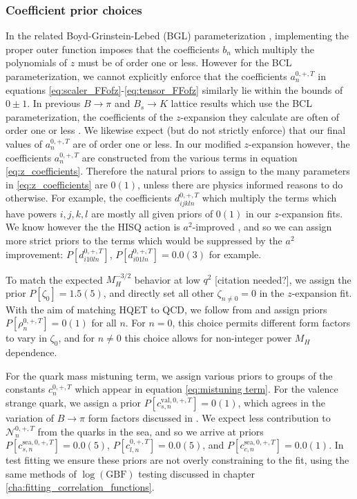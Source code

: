 \subsubsection{Coefficient prior choices}
In the related Boyd-Grinstein-Lebed (BGL) parameterization \cite{PhysRevLett.74.4603, PhysRevD.56.6895, GLENNBOYD1996493}, implementing the proper outer function imposes that the coefficients $b_n$ which multiply the polynomials of $z$ must be of order one or less.  However for the BCL parameterization, we cannot explicitly enforce that the coefficients $a_n^{0,+,T}$ in equations \ref{eq:scaler_FFofz}-\ref{eq:tensor_FFofz} similarly lie within the bounds of $0\pm1$.  In previous $B\rightarrow\pi$ and $B_s \rightarrow K$ lattice results which use the BCL parameterization, the coefficients of the $z$-expansion they calculate are often of order one or less \cite{nfzp-p5dn}.  We likewise expect (but do not strictly enforce) that our final values of $a_n^{0,+,T}$ are of order one or less.  In our modified $z$-expansion however, the coefficients $a_n^{0,+,T}$ are constructed from the various terms in equation \ref{eq:z_coefficients}.  Therefore the natural priors to assign to the many parameters in \ref{eq:z_coefficients} are $0(1)$, unless there are physics informed reasons to do otherwise.  For example, the coefficients $d_{ijkln}^{0,+,T}$ which multiply the terms which have powers $i,j,k,l$ are mostly all given priors of $0(1)$ in our $z$-expansion fits.
We know however the the HISQ action is $a^2$-improved \cite{HISQ:2006rc}, and so we can assign more strict priors to the terms which would be suppressed by the $a^2$ improvement: $P[d_{i10ln}^{0,+,T}]$,  $P[d_{i01ln}^{0,+,T}] = 0.0(3)$ for example.  

To match the expected $M_H^{-3/2}$ behavior at low $q^2$ [citation needed?], we assign the prior $P[\zeta_0] = 1.5(5)$, and directly set all other $\zeta_{n\neq0} = 0$ in the $z$-expansion fit.   With the aim of matching HQET to QCD, we follow from \cite{davies_bs_to_ds,Will_technical} and assign priors $P[\rho_n^{0,+,T}] = 0(1)$ for all $n$.  For $n=0$, this choice permits different form factors to vary in $\zeta_0$, and for $n\neq0$ this choice allows for non-integer power $M_H$ dependence.   

For the quark mass mistuning term, we assign various priors to groups of the constants $c_n^{0,+,T}$ which appear in equation \ref{eq:mistuning term}.  For the valence strange quark, we assign a prior $P[{c_{s,n}^{\mathrm{val},0,+,T}}]=0(1)$, which agrees in the variation of $B\rightarrow\pi$ form factors discussed in \cite{PhysRevD.93.034005}.  We expect less contribution to $\mathcal{N}_n^{0,+,T}$ from the quarks in the sea, and so we arrive at priors $P[{c_{s,n}^{\mathrm{sea},0,+,T}}]=0.0(5)$, $P[{c_{l,n}^{0,+,T}}]=0.0(5)$, and $P[{c_{c,n}^{\mathrm{sea},0,+,T}}]=0.0(1)$.  In test fitting we ensure these priors are not overly constraining to the fit, using the same methods of $\log(\mathrm{GBF})$ testing discussed in chapter \ref{cha:fitting_correlation_functions}.

